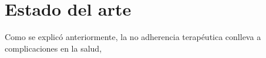 \chapter{Estado del arte}
\label{section_trabajos_relacionados}
Como se explicó anteriormente, la no adherencia terapéutica conlleva a complicaciones en la salud,